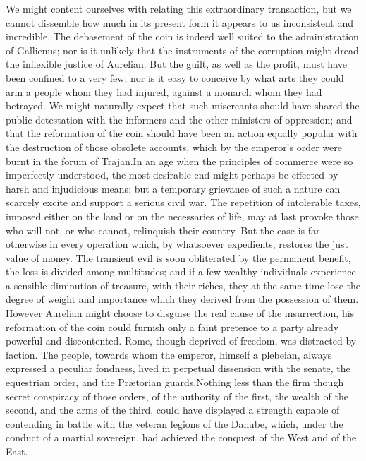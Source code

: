 We might content ourselves with relating this extraordinary
transaction, but we cannot dissemble how much in its present form
it appears to us inconsistent and incredible. The debasement of
the coin is indeed well suited to the administration of
Gallienus; nor is it unlikely that the instruments of the
corruption might dread the inflexible justice of Aurelian. But
the guilt, as well as the profit, must have been confined to a
very few; nor is it easy to conceive by what arts they could arm
a people whom they had injured, against a monarch whom they had
betrayed. We might naturally expect that such miscreants should
have shared the public detestation with the informers and the
other ministers of oppression; and that the reformation of the
coin should have been an action equally popular with the
destruction of those obsolete accounts, which by the emperor’s
order were burnt in the forum of Trajan.\footnotemark[90] In an age when the
principles of commerce were so imperfectly understood, the most
desirable end might perhaps be effected by harsh and injudicious
means; but a temporary grievance of such a nature can scarcely
excite and support a serious civil war. The repetition of
intolerable taxes, imposed either on the land or on the
necessaries of life, may at last provoke those who will not, or
who cannot, relinquish their country. But the case is far
otherwise in every operation which, by whatsoever expedients,
restores the just value of money. The transient evil is soon
obliterated by the permanent benefit, the loss is divided among
multitudes; and if a few wealthy individuals experience a
sensible diminution of treasure, with their riches, they at the
same time lose the degree of weight and importance which they
derived from the possession of them. However Aurelian might
choose to disguise the real cause of the insurrection, his
reformation of the coin could furnish only a faint pretence to a
party already powerful and discontented. Rome, though deprived of
freedom, was distracted by faction. The people, towards whom the
emperor, himself a plebeian, always expressed a peculiar
fondness, lived in perpetual dissension with the senate, the
equestrian order, and the Prætorian guards.\footnotemark[91] Nothing less than
the firm though secret conspiracy of those orders, of the
authority of the first, the wealth of the second, and the arms of
the third, could have displayed a strength capable of contending
in battle with the veteran legions of the Danube, which, under
the conduct of a martial sovereign, had achieved the conquest of
the West and of the East.

